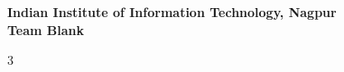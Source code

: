 \documentclass[10pt,landscape, a4paper]{article}
\begin{document}
\thispagestyle{empty}
\setcounter{page}{0}

\vspace*{\fill}
\begin{center}
{\Huge \textbf{Indian Institute of Information Technology, Nagpur}}\\[2cm]
{\LARGE \textbf{Team Blank}}
\end{center}
\vspace*{\fill}

\clearpage

\setcounter{page}{1}
\pagestyle{fancy}

\begin{multicols*}{3}

\setlength{\premulticols}{1pt}
\setlength{\postmulticols}{1pt}
\setlength{\multicolsep}{1pt}
\setlength{\columnsep}{2pt}


\end{multicols*}
\end{document}
